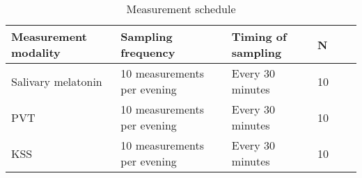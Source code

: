 \begin{table}[h]
\centering
\caption{Measurement schedule\label{tbl_schedule}}
\begin{tabularx}{\textwidth}{llllll}
\toprule
Measurement modality & Sampling frequency          & Timing of sampling & N \\ 
\midrule
Salivary melatonin   & 10 measurements per evening & Every 30 minutes   & 10                     \\
PVT                  & 10 measurements per evening & Every 30 minutes   & 10                     \\
KSS                  & 10 measurements per evening & Every 30 minutes   & 10                     \\ 
\bottomrule
\end{tabularx}
\end{table}